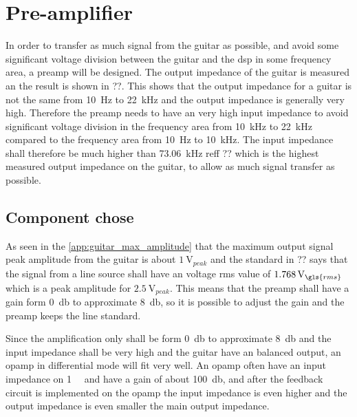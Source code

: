 \section{Pre-amplifier}
In order to transfer as much signal from the guitar as possible, and avoid some significant voltage division between the guitar and the \gls{dsp} in some frequency area, a \gls{preamp} will be designed. The output impedance of the guitar is measured an the result is shown in ??. This shows that the output impedance for a guitar is not the same from \SI{10}{\hertz} to \SI{22}{\kilo\hertz} and the output impedance is generally very high. Therefore the \gls{preamp} needs to have an very high input impedance to avoid significant voltage division in the frequency area from \SI{10}{\kilo\hertz} to \SI{22}{\kilo\hertz} compared to the frequency area from \SI{10}{\hertz} to \SI{10}{\kilo\hertz}. The input impedance shall therefore be much higher than \SI{73.06}{\kilo\hertz} reff ?? which is the highest measured output impedance on the guitar, to allow as much signal transfer as possible.

\subsection{Component chose}

As seen in the \autoref{app:guitar_max_amplitude} that the maximum output signal peak amplitude from the guitar is about $\SI{1}{\volt}_{peak}$ and the standard in ?? says that the signal from a line source shall have an voltage \gls{rms} value of $\SI{1.768}{\volt}_{\gls{rms}}$ which is a peak amplitude for $\SI{2.5}{\volt}_{peak}$. This means that the \gls{preamp} shall have a gain form \SI{0}{\decibel} to approximate \SI{8}{\decibel}, so it is possible to adjust the gain and the \gls{preamp} keeps the line standard. 

Since the amplification only shall be form \SI{0}{\decibel} to approximate \SI{8}{\decibel} and the input impedance shall be very high and the guitar have an balanced output, an \gls{opamp} in differential mode will fit very well. An \gls{opamp} often have an input impedance on \SI{1}{\mega\Ohm} and have a gain of about \SI{100}{\decibel}, and after the feedback circuit is implemented on the \gls{opamp} the input impedance is even higher and the output impedance is even smaller the main output impedance.

